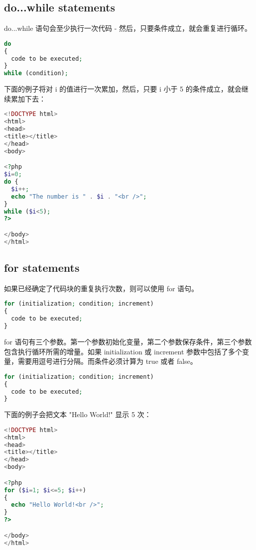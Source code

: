 \subsection{do...while statements}

do...while 语句会至少执行一次代码 - 然后，只要条件成立，就会重复进行循环。

\begin{lstlisting}[language=PHP]
do
{
  code to be executed;
}
while (condition); 
\end{lstlisting}

下面的例子将对 i 的值进行一次累加，然后，只要 i 小于 5 的条件成立，就会继续累加下去：

\begin{lstlisting}[language=PHP]
<!DOCTYPE html>
<html>
<head>
<title></title>
</head>
<body>

<?php 
$i=0;
do {
  $i++;
  echo "The number is " . $i . "<br />";
}
while ($i<5);
?>

</body>
</html>
\end{lstlisting}

\subsection{for statements}

如果已经确定了代码块的重复执行次数，则可以使用 for 语句。

\begin{lstlisting}[language=PHP]
for (initialization; condition; increment)
{
  code to be executed;
}
\end{lstlisting}

for 语句有三个参数。第一个参数初始化变量，第二个参数保存条件，第三个参数包含执行循环所需的增量。如果 initialization 或 increment 参数中包括了多个变量，需要用逗号进行分隔。而条件必须计算为 true 或者 false。

\begin{lstlisting}[language=PHP]
for (initialization; condition; increment)
{
  code to be executed;
}
\end{lstlisting}

下面的例子会把文本 "Hello World!" 显示 5 次：

\begin{lstlisting}[language=PHP]
<!DOCTYPE html>
<html>
<head>
<title></title>
</head>
<body>

<?php
for ($i=1; $i<=5; $i++)
{
  echo "Hello World!<br />";
}
?>

</body>
</html>
\end{lstlisting}

